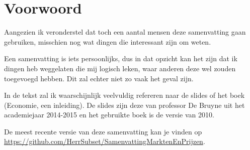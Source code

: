 \section*{Voorwoord}
Aangezien ik veronderstel dat toch een aantal mensen deze samenvatting gaan gebruiken, misschien nog wat dingen die interessant zijn om weten.

Een samenvatting is iets persoonlijks, dus in dat opzicht kan het zijn dat ik dingen heb weggelaten die mij logisch leken, waar anderen deze wel zouden toegevoegd hebben. Dit zal echter niet zo vaak het geval zijn.

In de tekst zal ik waarschijnlijk veelvuldig refereren naar de slides of het boek (Economie, een inleiding). De slides zijn deze van professor De Bruyne uit het academiejaar 2014-2015 en het gebruikte boek is de versie van 2010.

De meest recente versie van deze samenvatting kan je vinden op \url{https://github.com/HerrSubset/SamenvattingMarktenEnPrijzen}.
